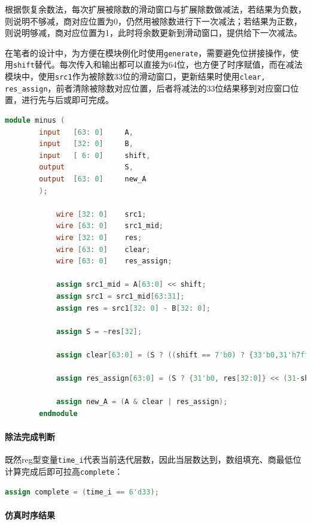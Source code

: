 \documentclass[UTF-8,twoside,c5size]{ctexart}
\begin{document}
	根据恢复余数法，每次扩展被除数的滑动窗口与扩展除数做减法，若结果为负数，则说明不够减，商对应位置为0，仍然用被除数进行下一次减法；若结果为正数，则说明够减，商对应位置为1，此时将余数更新到滑动窗口，提供给下一次减法。
	
	在笔者的设计中，为方便在模块例化时使用\texttt{generate}，需要避免位拼接操作，使用\texttt{shift}替代。每次传入和输出都可以直接为64位，也方便了时序赋值，而在减法模块中，使用\texttt{src1}作为被除数33位的滑动窗口，更新结果时使用\texttt{clear, res\_assign}，前者清除被除数对应位置，后者将减法的33位结果移到对应窗口位置，进行先与后或即可完成。
	
	\begin{lstlisting}[language=verilog]
		module minus (
		input   [63: 0]     A,
		input   [32: 0]     B,
		input   [ 6: 0]     shift,
		output              S,
		output  [63: 0]     new_A
		);
		
			wire [32: 0]    src1;
			wire [63: 0]    src1_mid;
			wire [32: 0]    res;
			wire [63: 0]    clear;
			wire [63: 0]    res_assign;
			
			assign src1_mid = A[63:0] << shift;
			assign src1 = src1_mid[63:31];
			assign res = src1[32: 0] - B[32: 0];
			
			assign S = ~res[32];
			
			assign clear[63:0] = (S ? ((shift == 7'b0) ? {33'b0,31'h7fffffff} : {1'b1,33'b0,30'h3fffffff} >>> (shift-1)) : 64'hffffffff);
			
			assign res_assign[63:0] = (S ? {31'b0, res[32:0]} << (31-shift) : 64'b0);
			
			assign new_A = (A & clear | res_assign);
		endmodule
	\end{lstlisting}

	\paragraph{除法完成判断}\hfill
	
	既然reg型变量\texttt{time\_i}代表当前迭代层数，因此当层数达到，数组填充、商最低位计算完成后即可拉高\texttt{complete}：
	
	\begin{lstlisting}[language=verilog]
		assign complete = (time_i == 6'd33);
	\end{lstlisting}

	\paragraph{仿真时序结果}\hfill
	
\end{document}
